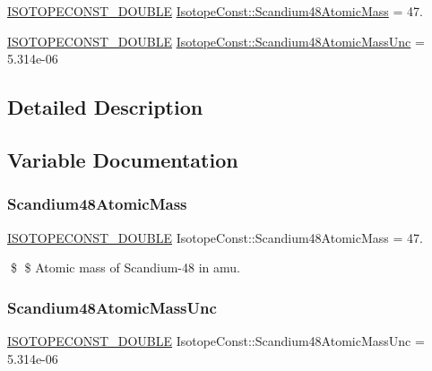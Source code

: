 \begin{DoxyCompactItemize}
\item 
\mbox{\hyperlink{group___isotope_const-_macros_ga8f45a7272ce02c0b4c65c44636ed719a}{I\+S\+O\+T\+O\+P\+E\+C\+O\+N\+S\+T\+\_\+\+D\+O\+U\+B\+LE}} \mbox{\hyperlink{group___isotope_const-_scandium-_sc48_gaf2e0454de9080af82cf446ce0cebdb81}{Isotope\+Const\+::\+Scandium48\+Atomic\+Mass}} = 47.
\item 
\mbox{\hyperlink{group___isotope_const-_macros_ga8f45a7272ce02c0b4c65c44636ed719a}{I\+S\+O\+T\+O\+P\+E\+C\+O\+N\+S\+T\+\_\+\+D\+O\+U\+B\+LE}} \mbox{\hyperlink{group___isotope_const-_scandium-_sc48_gadd94885c21422768df0d237d42873a87}{Isotope\+Const\+::\+Scandium48\+Atomic\+Mass\+Unc}} = 5.\+314e-\/06
\end{DoxyCompactItemize}


\subsection{Detailed Description}


\subsection{Variable Documentation}
\mbox{\label{group___isotope_const-_scandium-_sc48_gaf2e0454de9080af82cf446ce0cebdb81}} 
\subsubsection{\texorpdfstring{Scandium48\+Atomic\+Mass}{Scandium48AtomicMass}}
{\footnotesize\ttfamily \mbox{\hyperlink{group___isotope_const-_macros_ga8f45a7272ce02c0b4c65c44636ed719a}{I\+S\+O\+T\+O\+P\+E\+C\+O\+N\+S\+T\+\_\+\+D\+O\+U\+B\+LE}} Isotope\+Const\+::\+Scandium48\+Atomic\+Mass = 47.}

\$ \$ Atomic mass of Scandium-\/48 in amu. \mbox{\label{group___isotope_const-_scandium-_sc48_gadd94885c21422768df0d237d42873a87}} 
\subsubsection{\texorpdfstring{Scandium48\+Atomic\+Mass\+Unc}{Scandium48AtomicMassUnc}}
{\footnotesize\ttfamily \mbox{\hyperlink{group___isotope_const-_macros_ga8f45a7272ce02c0b4c65c44636ed719a}{I\+S\+O\+T\+O\+P\+E\+C\+O\+N\+S\+T\+\_\+\+D\+O\+U\+B\+LE}} Isotope\+Const\+::\+Scandium48\+Atomic\+Mass\+Unc = 5.\+314e-\/06}

